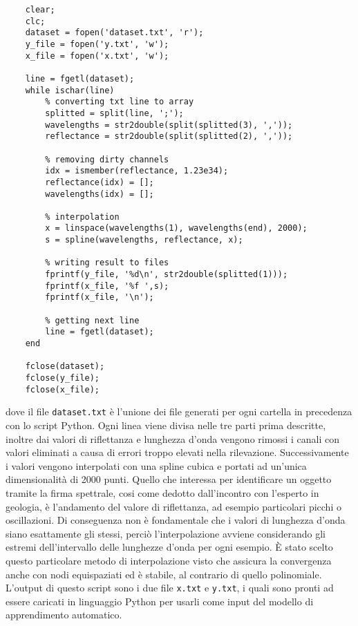 \begin{lstlisting}
    clear;
    clc;
    dataset = fopen('dataset.txt', 'r');
    y_file = fopen('y.txt', 'w');
    x_file = fopen('x.txt', 'w');

    line = fgetl(dataset);
    while ischar(line)
        % converting txt line to array
        splitted = split(line, ';');
        wavelengths = str2double(split(splitted(3), ','));
        reflectance = str2double(split(splitted(2), ','));
        
        % removing dirty channels
        idx = ismember(reflectance, 1.23e34);
        reflectance(idx) = [];
        wavelengths(idx) = [];
        
        % interpolation
        x = linspace(wavelengths(1), wavelengths(end), 2000);
        s = spline(wavelengths, reflectance, x);
        
        % writing result to files
        fprintf(y_file, '%d\n', str2double(splitted(1)));
        fprintf(x_file, '%f ',s);
        fprintf(x_file, '\n');
        
        % getting next line
        line = fgetl(dataset);
    end

    fclose(dataset);
    fclose(y_file);
    fclose(x_file);
\end{lstlisting}
dove il file \verb|dataset.txt| è l'unione dei file generati per ogni cartella in precedenza con lo script Python.
Ogni linea viene divisa nelle tre parti prima descritte, inoltre dai valori di riflettanza e lunghezza d'onda vengono rimossi i canali con valori eliminati a causa di errori troppo elevati nella rilevazione.
Successivamente i valori vengono interpolati con una spline cubica e portati ad un'unica dimensionalità di 2000 punti. Quello che interessa per identificare un oggetto tramite la firma spettrale, cosi come dedotto dall'incontro con l'esperto in geologia, è l'andamento del valore di riflettanza, ad esempio particolari picchi o oscillazioni. Di conseguenza non è fondamentale che i valori di lunghezza d'onda siano esattamente gli stessi, perciò l'interpolazione avviene considerando gli estremi dell'intervallo delle lunghezze d'onda per ogni esempio. È stato scelto questo particolare metodo di interpolazione visto che assicura la convergenza anche con nodi equispaziati ed è stabile, al contrario di quello polinomiale.\\
L'output di questo script sono i due file \verb|x.txt| e \verb|y.txt|, i quali sono pronti ad essere caricati in linguaggio Python per usarli come input del modello di apprendimento automatico.

